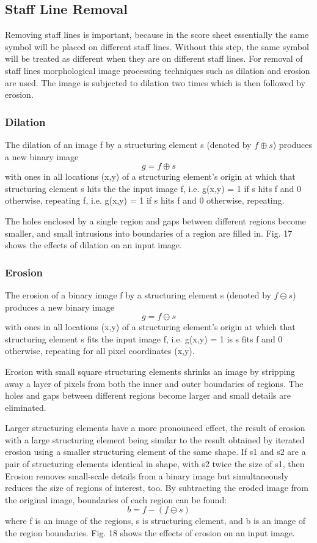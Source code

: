 \documentclass[journal]{IEEEtran}
\begin{document}
\subsection{Staff Line Removal}
 Removing staff lines is important, because
in the score sheet essentially the same symbol will be placed on different staff lines. Without this step, the same symbol will be treated as different when they are on different staff lines. For removal of staff lines morphological image processing techniques such as dilation and erosion are used. The image is subjected to dilation two times which is then followed by erosion.

\subsubsection{Dilation}
The dilation of an image f by a structuring element s (denoted by $ f \oplus s $)
produces a new binary image 
\[g = f \oplus s \] 
with ones in all locations (x,y) of a structuring element’s origin at which that structuring element s hits the the input image f, i.e. g(x,y) = 1 if s hits f and 0 otherwise, repeating f, i.e. g(x,y) = 1 if s hits f and 0 otherwise, repeating. \par
The holes enclosed by a single region and gaps between different regions become smaller, and
small intrusions into boundaries of a region are filled in. Fig. 17 shows the effects of dilation on an input image.

\subsubsection{Erosion}
The erosion of a binary image f by a structuring element s (denoted by $ f \ominus s $)
produces a new binary image
\[g = f \ominus s \]
with ones in all locations (x,y) of a structuring element’s origin at which that
structuring element s fits the input image f, i.e. g(x,y) = 1 is s fits f and 0 otherwise, repeating for
all pixel coordinates (x,y). \par
Erosion with small square structuring elements shrinks an image by stripping away a layer of
pixels from both the inner and outer boundaries of regions. The holes and gaps between different
regions become larger and small details are eliminated.\par
Larger structuring elements have a more pronounced effect, the result of erosion with a large
structuring element being similar to the result obtained by iterated erosion using a smaller structuring element of the same shape. If s1 and s2 are a pair of structuring elements identical in shape,
with s2 twice the size of s1, then
Erosion removes small-scale details from a binary image but simultaneously reduces the size of regions of interest, too. By subtracting the eroded image from the original image, boundaries of each region can be found:
\[ b = f - (f \ominus s) \]
where f is an image of the regions, s is structuring element, and b is an image of the region boundaries. Fig. 18 shows the effects of erosion on an input image.
\end{document}

